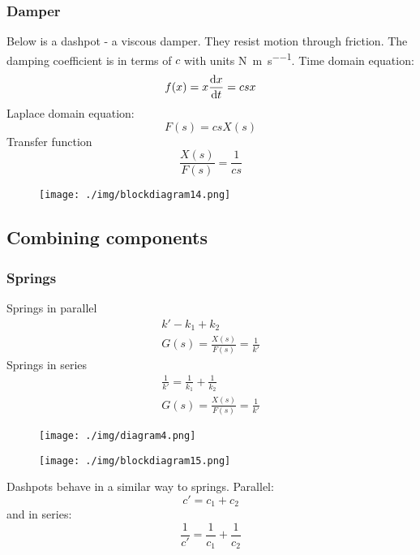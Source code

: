 \subsubsection{Damper}
Below is a dashpot - a viscous damper. They resist motion through friction. The damping coefficient is in terms of $c$ with units \si{\newton\per\meter\per\second}. Time domain equation:
\begin{equation}
  f(x) = x\frac{\dif x }{\dif t} = csx
\end{equation}
Laplace domain equation:
\begin{equation}
  F(s) = csX(s)
\end{equation}
Transfer function
\begin{equation}
  \frac{X(s)}{F(s)} = \frac{1}{cs}
\end{equation}
\begin{figure}[H]
  \centering
  \texttt{[image: ./img/blockdiagram14.png]}
\end{figure}
\subsection{Combining components}
\subsubsection{Springs}
Springs in parallel
\begin{gather}
  k' - k_1 + k_2\\
  G(s) = \frac{X(s)}{F(s)} = \frac{1}{k'}
\end{gather}
Springs in series
\begin{gather}
  \frac{1}{k'} = \frac{1}{k_1} + \frac{1}{k_2}\\
  G(s) = \frac{X(s)}{F(s)} = \frac{1}{k'}
\end{gather}
\begin{figure}[H]
  \centering
  \texttt{[image: ./img/diagram4.png]}
\end{figure}
\begin{figure}[H]
  \centering
  \texttt{[image: ./img/blockdiagram15.png]}
\end{figure}
Dashpots behave in a similar way to springs. Parallel:
\begin{equation}
  c' = c_1 + c_2
\end{equation}
and in series:
\begin{equation}
  \frac{1}{c'} = \frac{1}{c_1} + \frac{1}{c_2}
\end{equation}
